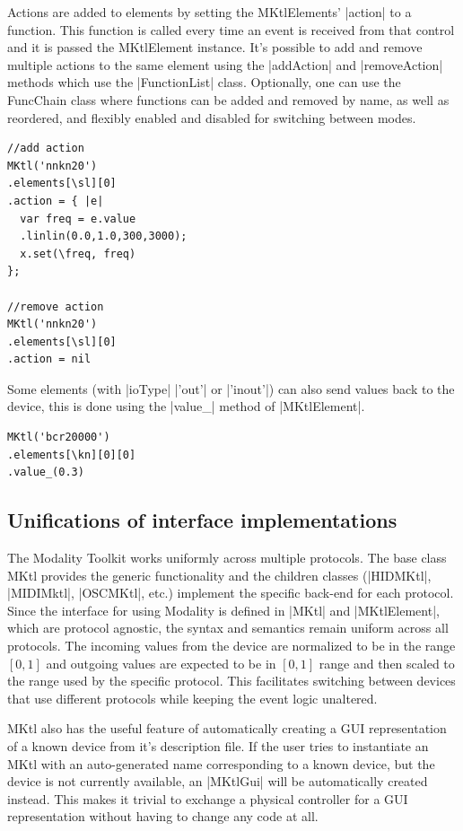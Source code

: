 \documentclass{article}
\begin{document}
Actions are added to elements by setting the MKtlElements' |action| to a function. This function is called every time an event is received from that control and it is passed the MKtlElement instance. It's possible to add and remove multiple actions to the same element using the |addAction| and |removeAction| methods which use the |FunctionList| class. Optionally, one can use the FuncChain class where functions can be added and removed by name, as well as reordered, and flexibly enabled and disabled for switching between modes. 

\begin{Verbatim}
//add action
MKtl('nnkn20')
.elements[\sl][0]
.action = { |e|
  var freq = e.value
  .linlin(0.0,1.0,300,3000);
  x.set(\freq, freq)
};

//remove action
MKtl('nnkn20')
.elements[\sl][0]
.action = nil
\end{Verbatim}

Some elements (with |ioType| |'out'| or |'inout'|) can also send values back to the device, this is done using the |value_| method of |MKtlElement|.

\begin{Verbatim}	
MKtl('bcr20000')
.elements[\kn][0][0]
.value_(0.3)
\end{Verbatim}

\subsection{Unifications of interface implementations}
\label{sub:unifications_of_interface_implementations}

The Modality Toolkit works uniformly across multiple protocols. The base class MKtl provides the generic functionality and the children classes (|HIDMKtl|, |MIDIMktl|, |OSCMKtl|, etc.) implement the specific back-end for each protocol. Since the interface for using Modality is defined in |MKtl| and |MKtlElement|, which are protocol agnostic, the syntax and semantics remain uniform across all protocols. The incoming values from the device are normalized to be in the range $[0,1]$ and outgoing values are expected to be in $[0,1]$ range and then scaled to the range used by the specific protocol. This facilitates switching between devices that use different protocols while keeping the event logic unaltered.

MKtl also has the useful feature of automatically creating a GUI representation of a known device from it's description file. If the user tries to instantiate an MKtl with an auto-generated name corresponding to a known device, but the device is not currently available, an |MKtlGui| will be automatically created instead. This makes it trivial to exchange a physical controller for a GUI representation without having to change any code at all.
\end{document}
